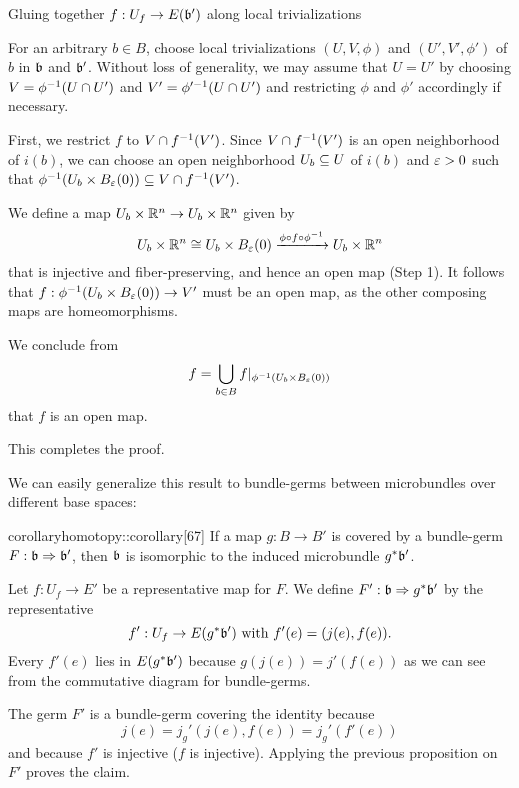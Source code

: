 \begin{myproof}
\begin{steps}
        \item Gluing together $f: U_f \to E(\bb')$ along local trivializations

        For an arbitrary $b \in B$, choose local trivializations $(U, V, \phi)$ and $(U', V', \phi')$ of $b$ in $\bb$ and $\bb'$.
        Without loss of generality,
        we may assume that $U = U'$ by choosing $V = \phi^{-1}(U \cap U')$ and $V' = \phi'^{-1}(U \cap U')$
        and restricting $\phi$ and $\phi'$ accordingly if necessary. 
        
        First, we restrict $f$ to $V \cap f^{-1}(V')$.
        Since $V \cap f^{-1}(V')$ is an open neighborhood of $i(b)$, we can choose
        an open neighborhood $U_b \subseteq{} U$ of $i(b)$ and $\varepsilon{} > 0$ such that $\inv{\phi}(U_b \cross \ball[\eps]) \sub V \cap \inv{f}(V')$.
        
        We define a map $U_b \times \mathbb{R}^n \to U_b \times \mathbb{R}^n$ given by
        \[ U_b \cross \R^n \cong  U_b \cross \ball[\eps] \xto{\phi \circ f \circ \inv{\phi}} U_b \cross \R^n \]
        that is injective and fiber-preserving, and hence an open map (Step 1).
        It follows that $f: \inv{\phi}(U_b \cross \ball[\eps]) \to V'$
        must be an open map, as the other composing maps are homeomorphisms.

        We conclude from 
        \[ f = \bigcup_{b \in B}f\restr{\inv{\phi}(U_b \cross \ball[\eps])} \]
        that $f$ is an open map.
    \end{steps}
    This completes the proof.
\end{myproof}

\begin{myparagraph}
    We can easily generalize this result to bundle-germs between microbundles over different base spaces:
\end{myparagraph}

\begin{mystatement}{corollary}{homotopy::corollary}[67]
    If a map $g: B \to B'$ is covered by a bundle-germ $\germdef{F}{\bb}{\bb'}$, then $\bb$ is isomorphic to the induced microbundle $\ind{g}\bb'$.
\end{mystatement}

\begin{myproof}
    Let $f: U_f \to E'$ be a representative map for $F$.
    We define $\germdef{F'}{\bb}{\ind{g}\bb'}$ by the representative
    \[ f': U_f \to E(\ind{g}\bb') \twith f'(e) = (j(e), f(e)). \]
    Every $f'(e)$ lies in $E(\ind{g}\bb')$ because
    $g(j(e)) = j'(f(e))$
    as we can see from the commutative diagram for bundle-germs.

    The germ $F'$ is a bundle-germ covering the identity because
    \[ j(e) = j_g'(j(e), f(e)) = j_g'(f'(e)) \]
    and because $f'$ is injective ($f$ is injective).
    Applying the previous proposition on $F'$ proves the claim.
\end{myproof}